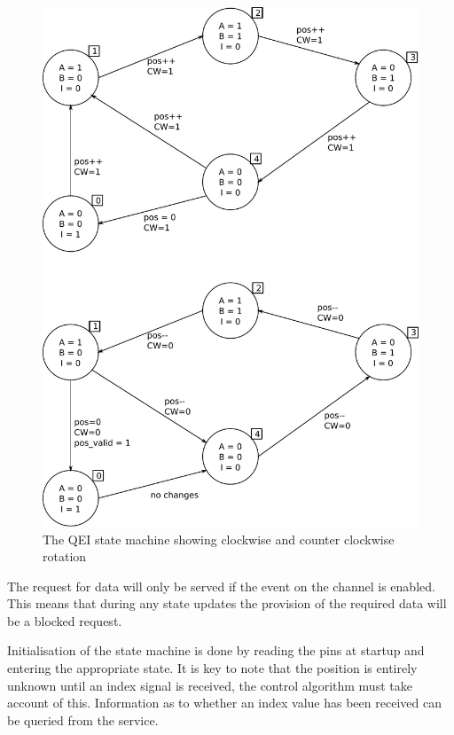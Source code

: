 \begin{figure}[p]
\begin{center}
\includegraphics[height=0.9\textheight]{images/qei-state.pdf}
\caption{The QEI state machine showing clockwise and counter clockwise rotation}
\label{fig_QeiStateMachine}
\end{center}
\end{figure}

The request for data will only be served if the event on the channel is enabled. This means that during any state updates the provision of the required data will be a blocked request.

Initialisation of the state machine is done by reading the pins at startup and entering the appropriate state. It is key to note that the position is entirely unknown until an index signal is received, the control algorithm must take account of this. Information as to whether an index value has been received can be queried from the service.

